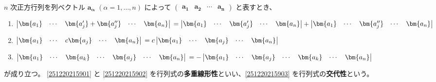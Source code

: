 \begin{thm}\label{251218172101}
  \(n\) 次正方行列を列ベクトル \(\bm{a_\alpha}\) \((\alpha=1,\ldots,n)\) によって \(
    \begin{pmatrix}
      \bm{a_1} & \bm{a_2} & \cdots &\bm{a_n}
    \end{pmatrix}
  \) と表すとき、
  \begin{enumerate}
    \item\label{251220215901} \(
        \begin{vmatrix}
          \bm{a_1} & \cdots & \bm{a'_j}+\bm{a''_j} & \cdots & \bm{a_n}
        \end{vmatrix} \\
        =
        \begin{vmatrix}
          \bm{a_1} & \cdots & \bm{a'_j} & \cdots & \bm{a_n}
        \end{vmatrix}
        +
        \begin{vmatrix}
          \bm{a_1} & \cdots & \bm{a''_j} & \cdots & \bm{a_n}
        \end{vmatrix}
      \)
    \item\label{251220215902} \(
        \begin{vmatrix}
          \bm{a_{1}} & \cdots & c\bm{a_j} & \cdots & \bm{a_n}
        \end{vmatrix} \\
        =c
        \begin{vmatrix}
          \bm{a_{1}} & \cdots & \bm{a_j} & \cdots & \bm{a_n}
        \end{vmatrix}
      \)
    \item\label{251220215903} \(
        \begin{vmatrix}
          \bm{a_{1}} & \cdots & \bm{a_k} & \cdots & \bm{a_j} & \cdots & \bm{a_n}
        \end{vmatrix} \\
        =-
        \begin{vmatrix}
          \bm{a_{1}} & \cdots & \bm{a_j} & \cdots & \bm{a_k} & \cdots & \bm{a_n}
        \end{vmatrix}
      \)
  \end{enumerate}
  が成り立つ。
  \ref{251220215901} と \ref{251220215902} を行列式の\textbf{多重線形性}といい、\ref{251220215903} を行列式の\textbf{交代性}という。
\end{thm}

